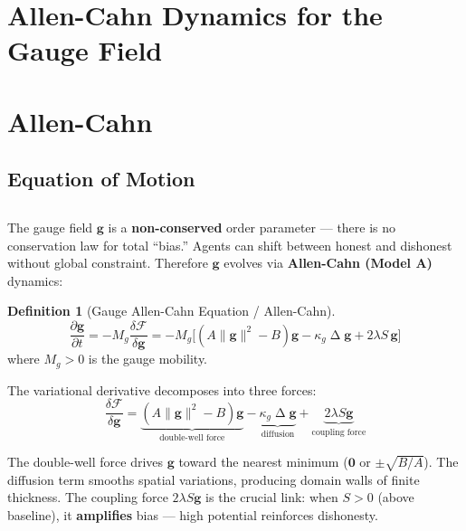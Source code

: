 \documentclass[12pt,a4paper]{article}
\theoremstyle{plain}
\theoremstyle{definition}
\newtheorem{definition}[theorem]{ Definition}
\newcommand{\cF}{\mathcal{F}}
\newcommand{\gf}{\mathbf{g}}          %
\newcommand{\Sf}{S}                   %
\DeclareMathOperator{\lap}{\Delta}
\begin{document}
\section{Allen-Cahn Dynamics for the Gauge Field}
\section*{Allen-Cahn}

\subsection{Equation of Motion}
\subsection*{}

The gauge field $\gf$ is a \textbf{non-conserved} order parameter — there is
no conservation law for total ``bias.'' Agents can shift between honest and
dishonest without global constraint. Therefore $\gf$ evolves via
\textbf{Allen-Cahn (Model A)} dynamics:

\begin{definition}[Gauge Allen-Cahn Equation / Allen-Cahn]
\label{def:gauge_ac}
\begin{equation}
    \frac{\partial \gf}{\partial t} = -M_g \frac{\delta \cF}{\delta \gf}
    = -M_g \Big[ (A\|\gf\|^2 - B)\gf - \kappa_g \lap \gf + 2\lambda \Sf \, \gf \Big]
    \label{eq:gauge_ac}
\end{equation}
where $M_g>0$ is the gauge mobility.
\end{definition}

The variational derivative decomposes into three forces:
\begin{equation}
    \frac{\delta \cF}{\delta \gf}
    = \underbrace{(A\|\gf\|^2 - B)\gf}_{\text{double-well force}}
    - \underbrace{\kappa_g \lap \gf}_{\text{diffusion}}
    + \underbrace{2\lambda \Sf \gf}_{\text{coupling force}}
    \label{eq:variational_g}
\end{equation}

The double-well force drives $\gf$ toward the nearest minimum ($\mathbf{0}$
or $\pm\sqrt{B/A}$). The diffusion term smooths spatial variations,
producing domain walls of finite thickness. The coupling force
$2\lambda\Sf\gf$ is the crucial link: when $\Sf>0$ (above baseline),
it \textbf{amplifies} bias — high potential reinforces dishonesty.
\end{document}
